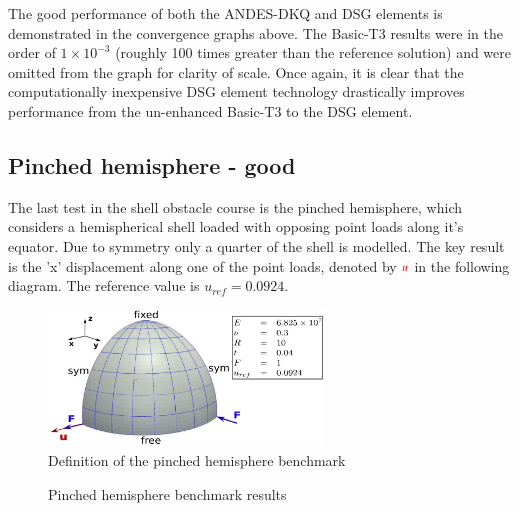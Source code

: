  The good performance of both the ANDES-DKQ and DSG elements is demonstrated in the convergence graphs above. The Basic-T3 results were in the order of $1\times10^{-3}$ (roughly 100 times greater than the reference solution) and were omitted from the graph for clarity of scale. Once again, it is clear that the computationally inexpensive DSG element technology drastically improves performance from the un-enhanced Basic-T3 to the DSG element.
\newpage
\subsection{Pinched hemisphere - good}
%

The last test in the shell obstacle course is the pinched hemisphere, which considers a hemispherical shell loaded with opposing point loads along it's equator. Due to symmetry only a quarter of the shell is modelled. The key result is the 'x' displacement along one of the point loads, denoted by $\textcolor{red}{u}$ in the following diagram. The reference value is $u_{ref} =  0.0924$. 

\begin{figure}[H]
	\centering
	\def\svgwidth{\columnwidth}
	\includegraphics[width=7.3cm]{images/pinchedhemisphere.png}
	\caption{Definition of the pinched hemisphere benchmark \cite{Bou13}}
\end{figure}

\begin{figure}[H]
	\caption{\label{ref_label_overall}Pinched hemisphere benchmark results}
\end{figure}

